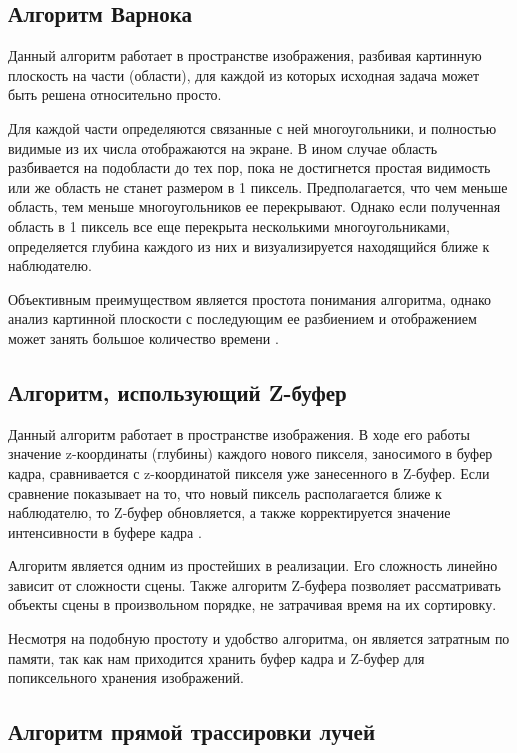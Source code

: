 \subsection{Алгоритм Варнока}

Данный алгоритм работает в пространстве изображения, разбивая картинную плоскость на части (области), для каждой из которых исходная задача может быть решена относительно просто.

Для каждой части определяются связанные с ней многоугольники, и полностью видимые из их числа отображаются на экране. В ином случае область разбивается на подобласти до тех пор, пока не достигнется простая видимость или же область не станет размером в 1 пиксель. Предполагается, что чем меньше область, тем меньше многоугольников ее перекрывают. Однако если полученная область в 1 пиксель все еще перекрыта несколькими многоугольниками, определяется глубина каждого из них и визуализируется находящийся ближе к наблюдателю.

Объективным преимуществом является простота понимания алгоритма, однако анализ картинной плоскости с последующим ее разбиением и отображением может занять большое количество времени \cite{alg_comp_graph}.

\subsection{Алгоритм, использующий Z-буфер}

Данный алгоритм работает в пространстве изображения. В ходе его работы значение z-координаты (глубины) каждого нового пикселя, заносимого в буфер кадра, сравнивается с z-координатой пикселя уже занесенного в Z-буфер. Если сравнение показывает на то, что новый пиксель располагается ближе к наблюдателю, то Z-буфер обновляется, а также корректируется значение интенсивности в буфере кадра \cite{rodz}.

Алгоритм является одним из простейших в реализации. Его сложность линейно зависит от сложности сцены. Также алгоритм Z-буфера позволяет рассматривать объекты сцены в произвольном порядке, не затрачивая время на их сортировку.

Несмотря на подобную простоту и удобство алгоритма, он является затратным по памяти, так как нам приходится хранить буфер кадра и Z-буфер для попиксельного хранения изображений.

\subsection{Алгоритм прямой трассировки лучей}

